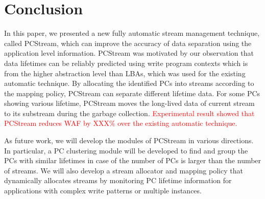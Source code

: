 \section{Conclusion}
In this paper, we presented a new fully automatic stream management technique,
called {\sf PCStream}, which can improve the accuracy of data separation
using the application level information.
{\sf PCStream} was motivated by our observation that data lifetimes can be
reliably predicted using write program contexts which is from the higher
abstraction level than LBAs, which was used for the existing automatic technique.
By allocating the identified PCs into streams according to the mapping policy,
{\sf PCStream} can separate different lifetime data. 
For some PCs showing various lifetime, {\sf PCStream} moves the long-lived data of 
current stream to its substream during the garbage collection.
\textcolor{red}{
Experimental result showed that {\sf PCStream} reduces WAF by XXX\% over the existing
automatic technique.}

As future work, we will develop the modules of {\sf PCStream} in various directions. 
In particular, a PC clustering module will be developed to find and group the PCs with similar lifetimes
in case of the number of PCs is larger than the number of streams.
We will also develop a stream allocator and mapping policy that dynamically allocates 
streams by monitoring PC lifetime information for 
applications with complex write patterns or multiple instances.
